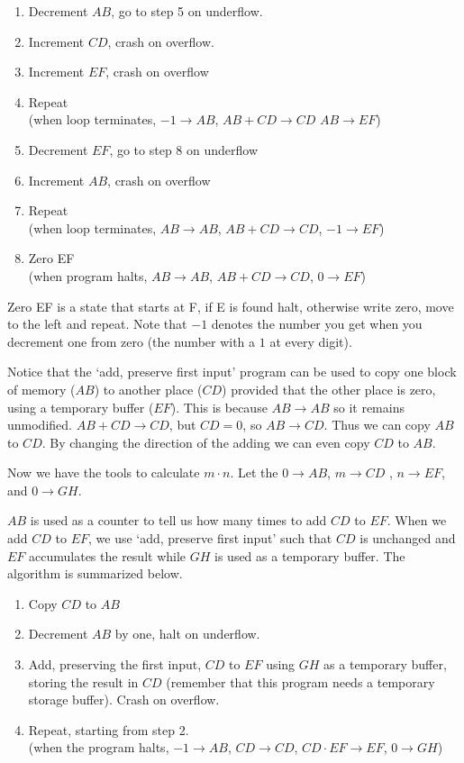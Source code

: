\documentclass[11pt, letterpaper, twoside, openright]{book}
\begin{document}
\begin{enumerate}
\item Decrement $AB$, go to step 5 on underflow.
\item Increment $CD$, crash on overflow.
\item Increment $EF$, crash on overflow
\item Repeat \\ (when loop terminates, $-1 \to AB$, $AB + CD \to CD$ $AB \to EF$)
\item Decrement $EF$, go to step 8 on underflow
\item Increment $AB$, crash on overflow
\item Repeat \\ (when loop terminates, $AB \to AB$, $AB + CD \to CD$, $-1 \to EF$)
\item Zero EF \\ (when program halts, $AB \to AB$, $AB + CD \to CD$, $0 \to EF$)
\end{enumerate}

Zero EF is a state that starts at F, if E is found halt, otherwise write zero, move to the left and repeat. Note that $-1$ denotes the number you get when you decrement one from zero (the number with a $1$ at every digit).

Notice that the `add, preserve first input' program can be used to copy one block of memory ($AB$) to another place ($CD$) provided that the other place is zero, using a temporary buffer ($EF$). This is because $AB \to AB$ so it remains unmodified. $AB + CD \to CD$, but $CD = 0$, so $AB \to CD$. Thus we can copy $AB$ to $CD$. By changing the direction of the adding we can even copy $CD$ to $AB$.

Now we have the tools to calculate $m \cdot n$. Let the $0 \to AB$, $m \to CD$ , $n \to EF$, and $0 \to GH$.

$AB$ is used as a counter to tell us how many times to add $CD$ to $EF$. When we add $CD$ to $EF$, we use `add, preserve first input' such that $CD$ is unchanged and $EF$ accumulates the result while $GH$ is used as a temporary buffer. The algorithm is summarized below.

\begin{enumerate}
\item Copy $CD$ to $AB$
\item Decrement $AB$ by one, halt on underflow.
\item Add, preserving the first input, $CD$ to $EF$ using $GH$ as a temporary buffer, storing the result in $CD$ (remember that this program needs a temporary storage buffer). Crash on overflow.
\item Repeat, starting from step 2. \\
(when the program halts, $-1 \to AB$, $CD \to CD$, $CD \cdot EF \to EF$, $0 \to GH$)
\end{enumerate}
\end{document}
